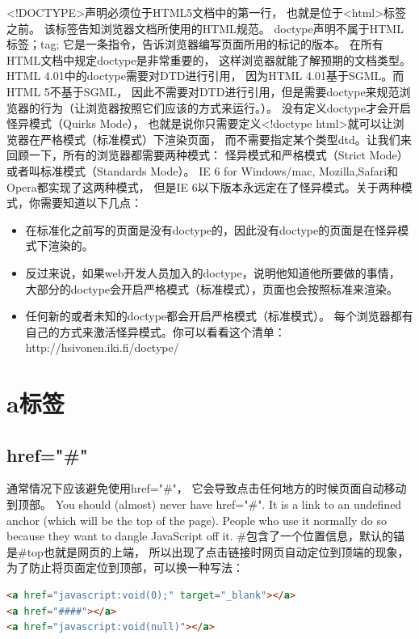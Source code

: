 \documentclass{book}
\begin{document}
<!DOCTYPE>声明必须位于HTML5文档中的第一行，
也就是位于<html>标签之前。
该标签告知浏览器文档所使用的HTML规范。
doctype声明不属于HTML标签；tag;
它是一条指令，告诉浏览器编写页面所用的标记的版本。
在所有HTML文档中规定doctype是非常重要的，
这样浏览器就能了解预期的文档类型。
HTML 4.01中的doctype需要对DTD进行引用，
因为HTML 4.01基于SGML。而HTML 5不基于SGML，
因此不需要对DTD进行引用，但是需要doctype来规范浏览器的行为（让浏览器按照它们应该的方式来运行。）。
没有定义doctype才会开启怪异模式（Quirks Mode），
也就是说你只需要定义<!doctype html>就可以让浏览器在严格模式（标准模式）下渲染页面，
而不需要指定某个类型dtd。让我们来回顾一下，所有的浏览器都需要两种模式：
怪异模式和严格模式（Strict Mode）或者叫标准模式（Standards Mode）。
IE 6 for Windows/mac, Mozilla,Safari和Opera都实现了这两种模式，
但是IE 6以下版本永远定在了怪异模式。关于两种模式，你需要知道以下几点：

\begin{itemize}
\item{在标准化之前写的页面是没有doctype的，因此没有doctype的页面是在怪异模式下渲染的。}
\item{反过来说，如果web开发人员加入的doctype，说明他知道他所要做的事情，
大部分的doctype会开启严格模式（标准模式），页面也会按照标准来渲染。}
\item{任何新的或者未知的doctype都会开启严格模式（标准模式）。
每个浏览器都有自己的方式来激活怪异模式。你可以看看这个清单：http://hsivonen.iki.fi/doctype/}
\end{itemize}

\section{a标签}

\subsection{href="\#"}

通常情况下应该避免使用href="\#"，
它会导致点击任何地方的时候页面自动移动到顶部。
You should (almost) never have href="\#". 
It is a link to an undefined anchor (which will be the top of the page). 
People who use it normally do so because they want to dangle JavaScript off it.
\#包含了一个位置信息，默认的锚是\#top也就是网页的上端，
所以出现了点击链接时网页自动定位到顶端的现象，
为了防止将页面定位到顶部，可以换一种写法：

\begin{lstlisting}[language=HTML]
<a href="javascript:void(0);" target="_blank"></a>
<a href="####"></a>
<a href="javascript:void(null)"></a>
\end{lstlisting}
\end{document}
